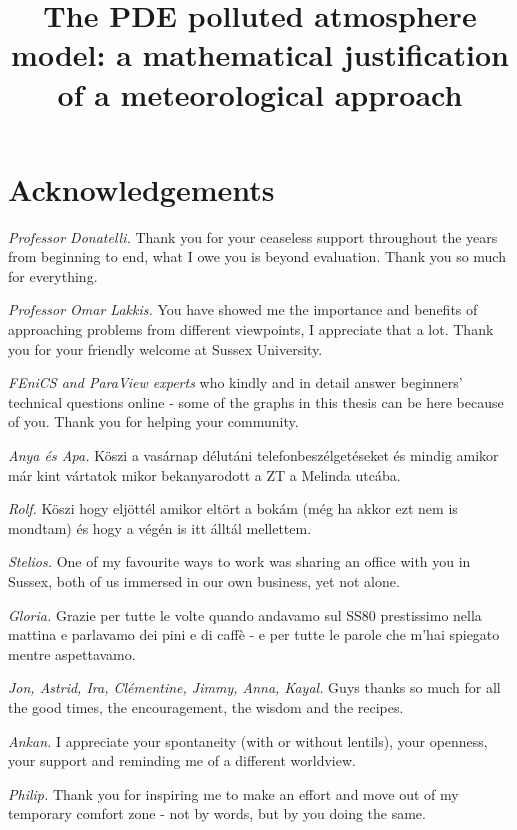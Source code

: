 \documentclass[12pt]{report}
\title{The PDE polluted atmosphere model: a mathematical justification of a meteorological approach}
\numberwithin{theorem}{chapter}
\numberwithin{corollary}{chapter}
\numberwithin{lemma}{chapter}
\numberwithin{remark}{chapter}
\numberwithin{definition}{chapter}
\numberwithin{prop}{chapter}
\newcommand\blankpage{%
    \null
    \thispagestyle{empty}%
    \addtocounter{page}{-1}%
    \newpage}
\begin{document}
\maketitle
\newpage
\afterpage{\blankpage}

\chapter*{Acknowledgements} 

\hspace*{5mm} \textit{Professor Donatelli.} Thank you for your ceaseless support throughout the years from beginning to end, what I owe you is beyond evaluation. Thank you so much for everything.

\textit{Professor Omar Lakkis.} You have showed me the importance and benefits of approaching problems from different viewpoints, I appreciate that a lot. Thank you for your friendly welcome at Sussex University.

\textit{FEniCS and ParaView experts} who kindly and in detail answer beginners' technical questions online - some of the graphs in this thesis can be here because of you. Thank you for helping your community.

\textit{Anya \'es Apa.} K\"oszi a vas\'arnap d\'elut\'ani telefonbesz\'elget\'eseket \'es mindig amikor m\'ar kint v\'artatok mikor bekanyarodott a ZT a Melinda utc\'aba.

\textit{Rolf.} K\"oszi hogy elj\"ott\'el amikor elt\"ort a bok\'am (m\'eg ha akkor ezt nem is mondtam) \'es hogy a v\'eg\'en is itt \'allt\'al mellettem.

\textit{Stelios.} One of my favourite ways to work was sharing an office with you in Sussex, both of us immersed in our own business, yet not alone. 

\textit{Gloria.} Grazie per tutte le volte quando andavamo sul SS80 prestissimo nella mattina e parlavamo dei pini e di caff\`e - e per tutte le parole che m'hai spiegato mentre aspettavamo.

\textit{Jon, Astrid, Ira, Cl\'ementine, Jimmy, Anna, Kayal.} Guys thanks so much for all the good times, the encouragement, the wisdom and the recipes.

\textit{Ankan.} I appreciate your spontaneity (with or without lentils), your openness, your support and reminding me of a different worldview.

\textit{Philip.} Thank you for inspiring me to make an effort and move out of my temporary comfort zone - not by words, but by you doing the same.
\end{document}
